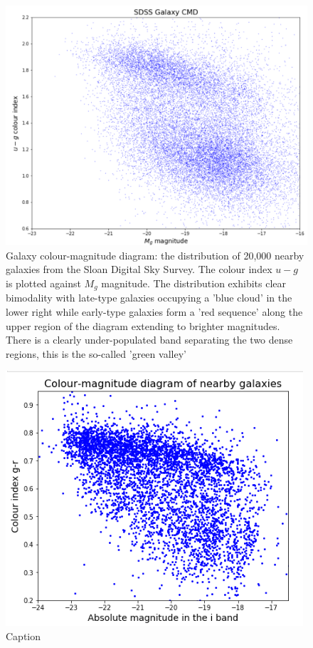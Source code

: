\begin{figure}
	\includegraphics[width=\columnwidth]{images/CMDs/galaxyCMD.PNG}
    \caption[Galaxy CMD]{Galaxy colour-magnitude diagram: the distribution of 20,000 nearby galaxies from the Sloan Digital Sky Survey. The colour index $u-g$ is plotted against $M_g$ magnitude. The distribution exhibits clear bimodality with late-type galaxies occupying a 'blue cloud' in the lower right while early-type galaxies form a 'red sequence' along the upper region of the diagram extending to brighter magnitudes. There is a clearly under-populated band separating the two dense regions, this is the so-called 'green valley'}
    \label{fig:CMD1}
\end{figure}


\begin{figure}
    \centering
    \includegraphics[width=\columnwidth]{images/CMDs/CMD-MaNGA-1.png}
    \caption{Caption}
    \label{fig:my_label}
\end{figure}

